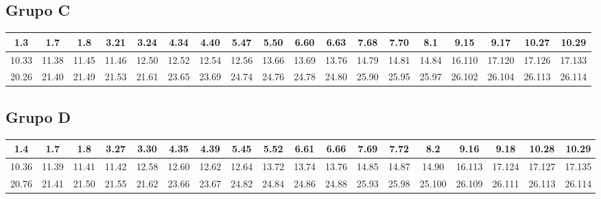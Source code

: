 \documentclass[10pt,letterpaper,landscape]{article}
\begin{document}
\subsection*{\textcolor{azul}{Grupo C}}
\begin{center}\footnotesize
\begin{tabular}{||c|c|c|c|c|c|c|c|c|c|c|c|c|c|c|c|c|c||}
\hline
1.3 & 1.7 & 1.8 & 3.21 & 3.24 & 4.34 & 4.40 & 5.47 & 5.50 & 6.60 & 6.63 & 7.68 & 7.70 & 8.1 & 9.15 & 9.17 & 10.27 & 10.29\\ \hline\hline
10.33 & 11.38 & 11.45 & 11.46 & 12.50 & 12.52 & 12.54 & 12.56 & 13.66 & 13.69 & 13.76 & 14.79 & 14.81 & 14.84 & 16.110 & 17.120 & 17.126 & 17.133 \\ \hline\hline
20.26 & 21.40 & 21.49 & 21.53 & 21.61 & 23.65 & 23.69 & 24.74 & 24.76 & 24.78 & 24.80 & 25.90 & 25.95 & 25.97 & 26.102 & 26.104 & 26.113 & 26.114 \\ \hline\hline
\end{tabular}
\end{center}
\vspace{5pt}
\subsection*{\textcolor{azul}{Grupo D}}
\begin{center}\footnotesize
\begin{tabular}{||c|c|c|c|c|c|c|c|c|c|c|c|c|c|c|c|c|c||}
\hline
1.4 & 1.7 & 1.8 & 3.27 & 3.30 & 4.35 & 4.39 & 5.45 & 5.52 & 6.61 & 6.66 & 7.69 & 7.72 & 8.2 & 9.16 & 9.18 & 10.28 & 10.29 \\ \hline\hline
10.36 & 11.39 & 11.41 & 11.42 & 12.58 & 12.60 & 12.62 & 12.64 & 13.72 & 13.74 & 13.76 & 14.85 & 14.87 & 14.90 & 16.113 & 17.124 & 17.127 & 17.135\\ \hline\hline
20.76 & 21.41 & 21.50 & 21.55 & 21.62 & 23.66 & 23.67 & 24.82 & 24.84 & 24.86 & 24.88 & 25.93 & 25.98 & 25.100 & 26.109 &  26.111 & 26.113 & 26.114 \\ \hline\hline
\end{tabular}
\end{center}
\vspace{5pt}
\end{document}
